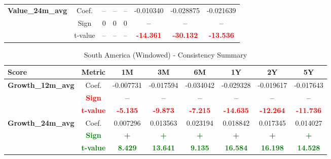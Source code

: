 \documentclass[11pt,english,a4paper,hidelinks]{book}
\begin{document}
\begin{table}[H]
\begin{tabular}{lccccccc}
        \multirow{3}{*}{\textbf{Value\_24m\_avg}} 
            & Coef.   & -- & -- & -- & -0.010340 & -0.028875 & -0.021639 \\
            & Sign    & 0 & 0 & 0 & \textbf{\textcolor{red}{–}} & \textbf{\textcolor{red}{–}} & \textbf{\textcolor{red}{–}} \\
            & t-value & -- & -- & -- & \textbf{\textcolor{red}{-14.361}} & \textbf{\textcolor{red}{-30.132}} & \textbf{\textcolor{red}{-13.536}} \\
        \bottomrule
    \end{tabular}
    \label{tab:asia_oceania_windowed_consistency_summary}
\end{table}

\begin{table}[H]
    \centering
    \caption{South America (Windowed) - Consistency Summary}
    \begin{tabular}{lccccccc}
        \toprule
        \textbf{Score} & \textbf{Metric} & \textbf{1M} & \textbf{3M} & \textbf{6M} & \textbf{1Y} & \textbf{2Y} & \textbf{5Y} \\
        \midrule
        \multirow{3}{*}{\textbf{Growth\_12m\_avg}}
            & Coef.   & -0.007731 & -0.017594 & -0.034042 & -0.029328 & -0.019617 & -0.017643 \\
            & \textbf{\textcolor{red}{Sign}}    & \textbf{\textcolor{red}{–}} & \textbf{\textcolor{red}{–}} & \textbf{\textcolor{red}{–}} & \textbf{\textcolor{red}{–}} & \textbf{\textcolor{red}{–}} & \textbf{\textcolor{red}{–}} \\
            & \textbf{\textcolor{red}{t-value}} & \textbf{\textcolor{red}{-5.135}} & \textbf{\textcolor{red}{-9.873}} & \textbf{\textcolor{red}{-7.215}} & \textbf{\textcolor{red}{-14.635}} & \textbf{\textcolor{red}{-12.264}} & \textbf{\textcolor{red}{-11.736}} \\
        \multirow{3}{*}{\textbf{Growth\_24m\_avg}}
            & Coef.   & 0.007296 & 0.013563 & 0.023194 & 0.018842 & 0.017345 & 0.014027 \\
            & \textbf{\textcolor{green}{Sign}}    & \textbf{\textcolor{green}{+}} & \textbf{\textcolor{green}{+}} & \textbf{\textcolor{green}{+}} & \textbf{\textcolor{green}{+}} & \textbf{\textcolor{green}{+}} & \textbf{\textcolor{green}{+}} \\
            & \textbf{\textcolor{green}{t-value}} & \textbf{\textcolor{green}{8.429}} & \textbf{\textcolor{green}{13.641}} & \textbf{\textcolor{green}{9.135}} & \textbf{\textcolor{green}{16.584}} & \textbf{\textcolor{green}{16.198}} & \textbf{\textcolor{green}{14.528}} \\

\end{tabular}
\end{table}
\end{document}

